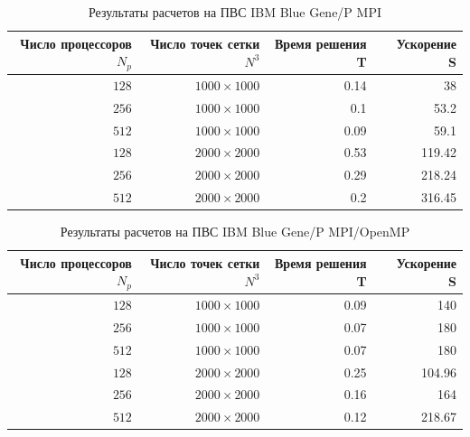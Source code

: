 \documentclass [12pt, a4paper] {article}
\begin{document}
\begin{table}[htb]
    \centering
    \caption{Результаты расчетов на ПВС IBM Blue Gene/P MPI}
    \begin{tabular}{|r|r|r|r|}
        \hline
        Число процессоров $N_p$ & Число точек сетки $N^3$ & Время решения T & \
            Ускорение S \\ \hline
        $128$ & $ 1000 \times 1000 $ & 0.14 & 38 \\ 
        $256$ & $ 1000 \times 1000 $ & 0.1 & 53.2 \\ 
        $512$ & $ 1000 \times 1000 $ & 0.09 & 59.1 \\ \hline
        $128$ & $ 2000 \times 2000 $ & 0.53 & 119.42 \\ 
        $256$ & $ 2000 \times 2000 $ & 0.29 & 218.24 \\ 
        $512$ & $ 2000 \times 2000 $ & 0.2 & 316.45 \\ \hline
    \end{tabular}
\end{table}
\begin{table}[htb]
    \centering
    \caption{Результаты расчетов на ПВС IBM Blue Gene/P MPI/OpenMP}
    \begin{tabular}{|r|r|r|r|}
        \hline
        Число процессоров $N_p$ & Число точек сетки $N^3$ & Время решения T & \
            Ускорение S \\ \hline
        $128$ & $ 1000 \times 1000 $ & 0.09 & 140 \\ 
        $256$ & $ 1000 \times 1000 $ & 0.07 & 180 \\ 
        $512$ & $ 1000 \times 1000 $ & 0.07 & 180 \\ \hline
        $128$ & $ 2000 \times 2000 $ & 0.25 & 104.96 \\ 
        $256$ & $ 2000 \times 2000 $ & 0.16 & 164 \\ 
        $512$ & $ 2000 \times 2000 $ & 0.12 & 218.67 \\ \hline
    \end{tabular}
\end{table}


\newpage
\end{document}
